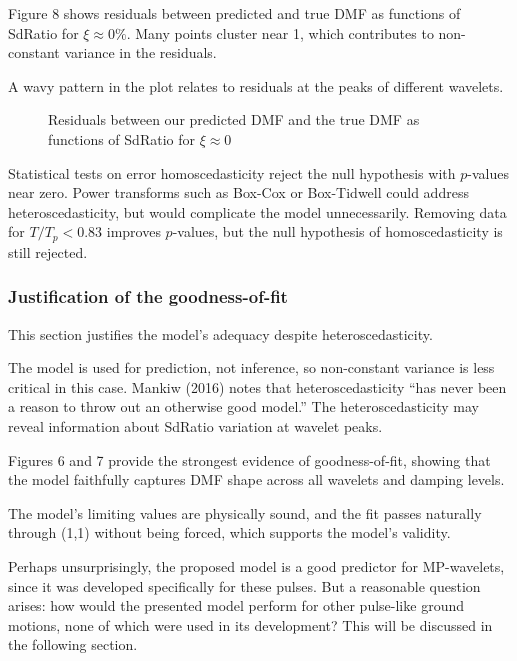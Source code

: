 Figure 8 shows residuals between predicted and true DMF as functions of
SdRatio for \(\xi \approx 0\%\). Many points cluster near 1, which
contributes to non-constant variance in the residuals.

A wavy pattern in the plot relates to residuals at the peaks of
different wavelets.

\begin{figure}
\centering
{}
\caption{Residuals between our predicted DMF and the true DMF as
functions of SdRatio for \(\xi \approx 0\)}
\end{figure}

Statistical tests on error homoscedasticity reject the null hypothesis
with \(p\)-values near zero. Power transforms such as Box-Cox or
Box-Tidwell could address heteroscedasticity, but would complicate the
model unnecessarily. Removing data for \(T/T_p < 0.83\) improves
\(p\)-values, but the null hypothesis of homoscedasticity is still
rejected.

\subsubsection{Justification of the
goodness-of-fit}\label{justification-of-the-goodness-of-fit}

This section justifies the model's adequacy despite heteroscedasticity.

The model is used for prediction, not inference, so non-constant
variance is less critical in this case. Mankiw (2016) notes that
heteroscedasticity ``has never been a reason to throw out an otherwise
good model.'' The heteroscedasticity may reveal information about
SdRatio variation at wavelet peaks.

Figures 6 and 7 provide the strongest evidence of goodness-of-fit,
showing that the model faithfully captures DMF shape across all wavelets
and damping levels.

The model's limiting values are physically sound, and the fit passes
naturally through (1,1) without being forced, which supports the model's
validity.

Perhaps unsurprisingly, the proposed model is a good predictor for
MP-wavelets, since it was developed specifically for these pulses. But a
reasonable question arises: how would the presented model perform for
other pulse-like ground motions, none of which were used in its
development? This will be discussed in the following section.

